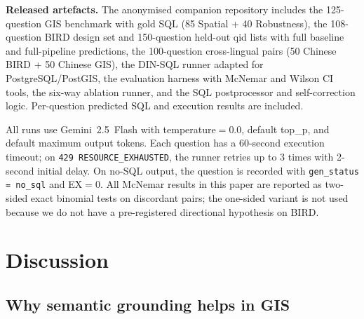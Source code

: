\documentclass[11pt]{article}
\begin{document}
\noindent\textbf{Released artefacts.} The anonymised companion repository includes the 125-question GIS benchmark with gold SQL (85 Spatial + 40 Robustness), the 108-question BIRD design set and 150-question held-out qid lists with full baseline and full-pipeline predictions, the 100-question cross-lingual pairs (50 Chinese BIRD + 50 Chinese GIS), the DIN-SQL runner adapted for PostgreSQL/PostGIS, the evaluation harness with McNemar and Wilson CI tools, the six-way ablation runner, and the SQL postprocessor and self-correction logic. Per-question predicted SQL and execution results are included.

\noindent All runs use Gemini~2.5~Flash with temperature$=0.0$, default top\_p, and default maximum output tokens. Each question has a 60-second execution timeout; on \texttt{429 RESOURCE\_EXHAUSTED}, the runner retries up to 3 times with 2-second initial delay. On no-SQL output, the question is recorded with \texttt{gen\_status = no\_sql} and EX$=0$. All McNemar results in this paper are reported as two-sided exact binomial tests on discordant pairs; the one-sided variant is not used because we do not have a pre-registered directional hypothesis on BIRD.

\section{Discussion}
\label{sec:discussion}

\subsection{Why semantic grounding helps in GIS}
\end{document}
